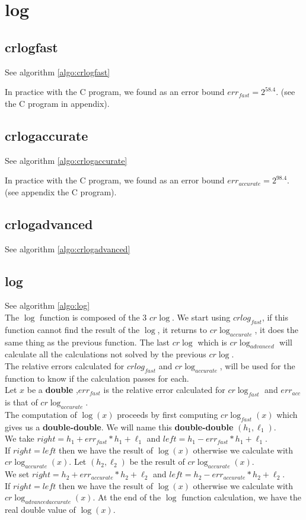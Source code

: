 \chapter{log}
\section{crlogfast}
See algorithm \ref{algo:crlogfast}

In practice with the C program, we found as an error bound $err_{fast} = 2^{58.4}$. (see the C program in appendix).

\section{crlogaccurate}
See algorithm \ref{algo:crlogaccurate}

In practice with the C program, we found as an error bound $err_{accurate} = 2^{98.4}$. (see appendix the C program).

\section{crlogadvanced}
See algorithm \ref{algo:crlogadvanced}
\section{log}
See algorithm \ref{algo:log}\\
The $\log$ function is composed of the $3$ $cr\log$.
We start using $crlog_{fast}$, if this function cannot find the result of the $\log$, it returns to $cr\log_{accurate}$, it does the same thing as the previous function. The last $cr\log$ which is $cr\log_{advanced}$ will calculate all the calculations not solved by the previous $cr\log$.\\
The relative errors calculated  for  $crlog_{fast}$ and $cr\log_{accurate}$, will be used for the function to know if the calculation passes for each.\\
Let $x$ be a \textbf{double} ,$err_{fast}$ is the relative error calculated for $cr\log_{fast}$ and $err_{acc}$ is that of $cr\log_{accurate}$.\\ 
The computation of $\log(x)$ proceeds by first computing $cr\log_{fast}(x)$ which gives us a \textbf{double-double}. We will name this \textbf{double-double} $(h_1,\ell_1)$. \\
We take $right = h_1+err_{fast}*h_1+\ell_1$ and $left = h_1-err_{fast}*h_1+\ell_1$.\\
If $right = left$ then we have the result of $\log(x)$ otherwise we calculate with $cr\log_{accurate}(x)$. Let $(h_2,\ell_2)$ be the result of $cr\log_{accurate}(x)$.\\
We set $right = h_2+err_{accurate}*h_2+\ell_2$ and $left = h_2-err_{accurate}*h_2+\ell_2$.\\
If $right = left$ then we have the result of $\log(x)$ otherwise we calculate with $cr\log_{advancedaccurate}(x)$.
At the end of the $\log$ function calculation, we have the real double value of $\log(x)$.
